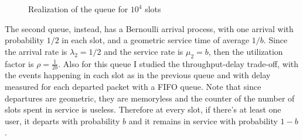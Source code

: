 \documentclass[10pt]{article}
\begin{document}
\begin{figure}[h!]
\centering
  \caption{Realization of the queue for $10^4$ slots}
  \label{fig:queue_a_real}
\end{figure}


The second queue, instead, has a Bernoulli arrival process, with one arrival with probability $1/2$ in each slot, and a geometric service time of average $1/b$. Since the arrival rate is $\lambda_2 = 1/2$ and the service rate is $\mu_2 = b$, then the utilization factor is $\rho = \frac{1}{2b}$. Also for this queue I studied the throughput-delay trade-off, with the events happening in each slot as in the previous queue and with delay measured for each departed packet with a FIFO queue. Note that since departures are geometric, they are memoryless and the counter of the number of slots spent in service is useless. Therefore at every slot, if there's at least one user, it departs with probability $b$ and it remains in service with probability $1-b$. 
\end{document}
